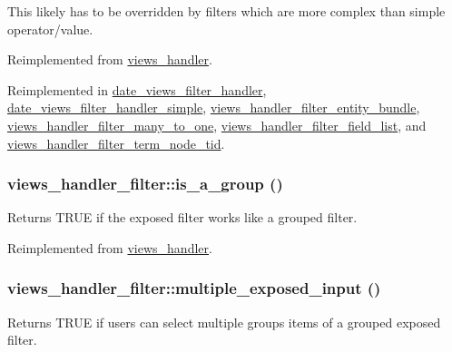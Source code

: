 This likely has to be overridden by filters which are more complex than simple operator/value. 

Reimplemented from \hyperlink{classviews__handler_aa7df174ffa94ab095f7b9fdf154bcc30}{views\_\-handler}.

Reimplemented in \hyperlink{classdate__views__filter__handler_adaa0b2cd0664c75f987af0b79386a3b7}{date\_\-views\_\-filter\_\-handler}, \hyperlink{classdate__views__filter__handler__simple_ad88e187cbc6c8f5a48f4ad9daf83fff8}{date\_\-views\_\-filter\_\-handler\_\-simple}, \hyperlink{classviews__handler__filter__entity__bundle_aec203c1ccc0f4189a1fba3fae621ce9c}{views\_\-handler\_\-filter\_\-entity\_\-bundle}, \hyperlink{classviews__handler__filter__many__to__one_aecb4fb4dbe4f93d157cb8a7b699fea22}{views\_\-handler\_\-filter\_\-many\_\-to\_\-one}, \hyperlink{classviews__handler__filter__field__list_a0c04261667d87e0a74c2036a6a62ee75}{views\_\-handler\_\-filter\_\-field\_\-list}, and \hyperlink{classviews__handler__filter__term__node__tid_ab4f316cfbf968a2faa8e574b9df5c4f3}{views\_\-handler\_\-filter\_\-term\_\-node\_\-tid}.\hypertarget{classviews__handler__filter_a4a7529b9fa68f93d5343c861e7c67c3d}{
\subsubsection[{is\_\-a\_\-group}]{\setlength{\rightskip}{0pt plus 5cm}views\_\-handler\_\-filter::is\_\-a\_\-group ()}}
\label{classviews__handler__filter_a4a7529b9fa68f93d5343c861e7c67c3d}
Returns TRUE if the exposed filter works like a grouped filter. 

Reimplemented from \hyperlink{classviews__handler_a946a9b922261327ff2f59a0287e6b288}{views\_\-handler}.\hypertarget{classviews__handler__filter_a27b938e318eb0a311480f8d7a684e426}{
\subsubsection[{multiple\_\-exposed\_\-input}]{\setlength{\rightskip}{0pt plus 5cm}views\_\-handler\_\-filter::multiple\_\-exposed\_\-input ()}}
\label{classviews__handler__filter_a27b938e318eb0a311480f8d7a684e426}
Returns TRUE if users can select multiple groups items of a grouped exposed filter. 


